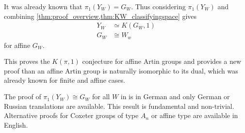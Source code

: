 \documentclass[class=article, crop=false]{standalone}
\begin{document}
It was already known \cite{brieskorn_fundamentalgruppe_1971} that $\pi_1(Y_W) = G_W$. Thus considering $\pi_1(Y_W)$ and combining \cref{thm:proof_overview,thm:KW_classifyingspace} gives
\begin{align*}
	Y_W &\simeq K(G_W,1)\\
	G_W &\cong W_w
	\label{eq:artin_iso_dual}
\end{align*}
for affine $G_W$.

This proves the $K(\pi, 1)$ conjecture for affine Artin groups and provides a new proof than an affine Artin group is naturally isomorphic to its dual, which was already known for finite \cite{bessis_dual_2003} and affine \cite{mccammond_sulway_artin_2017} cases.

The proof of $\pi_1(Y_W) \cong G_W$ for all $W$ in \cite{brieskorn_fundamentalgruppe_1971} is in German and only German or Russian translations are available. This result is fundamental and non-trivial. Alternative proofs for Coxeter groups of type $A_n$ \cite{fox_braid_1962} or affine type \cite{viet_dung_fundamental_1983} are available in English.
\end{document}
